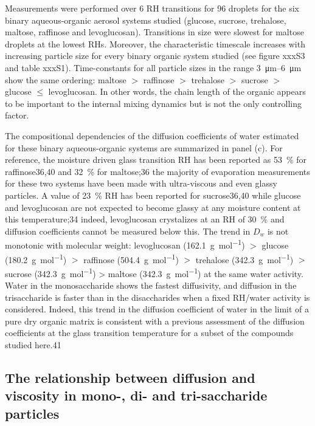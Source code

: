 Measurements were performed over 6 RH transitions for 96 droplets for the six binary aqueous-organic aerosol systems studied (glucose, sucrose, trehalose, maltose, raffinose and levoglucosan). Transitions in size were slowest for maltose droplets at the lowest RHs. Moreover, the characteristic timescale increases with increasing particle size for every binary organic system studied (see figure xxxS3 and table xxxS1). Time-constants for all particle sizes in the range \SIrange{3}{6}{\micro\meter} show the same ordering: maltose $>$ raffinose $>$ trehalose $>$ sucrose $>$ glucose $\le$ levoglucosan. In other words, the chain length of the organic appears to be important to the internal mixing dynamics but is not the only controlling factor.

The compositional dependencies of the diffusion coefficients of water estimated for these binary aqueous-organic systems are summarized in panel (c). For reference, the moisture driven glass transition RH has been reported as \SI{53}{\percent} for raffinose36,40 and \SI{32}{\percent} for maltose;36 the majority of evaporation measurements for these two systems have been made with ultra-viscous and even glassy particles. A value of \SI{23}{\percent} RH has been reported for sucrose36,40 while glucose and levoglucosan are not expected to become glassy at any moisture content at this temperature;34 indeed, levoglucosan crystalizes at an RH of \SI{30}{\percent} and diffusion coefficients cannot be measured below this. The trend in $D_{w}$ is not monotonic with molecular weight: levoglucosan (\SI{162.1}{\gram\per\mol}) $>$ glucose (\SI{180.2}{\gram\per\mol}) $>$ raffinose (\SI{504.4}{\gram\per\mole}) $>$ trehalose (\SI{342.3}{\gram\per\mole}) $>$ sucrose (\SI{342.3}{\gram\per\mol}) > maltose (\SI{342.3}{\gram\per\mole}) at the same water activity. Water in the monosaccharide shows the fastest diffusivity, and diffusion in the trisaccharide is faster than in the disaccharides when a fixed RH/water activity is considered. Indeed, this trend in the diffusion coefficient of water in the limit of a pure dry organic matrix is consistent with a previous assessment of the diffusion coefficients at the glass transition temperature for a subset of the compounds studied here.41

\subsection{The relationship between diffusion and viscosity in mono-, di- and tri-saccharide particles}

